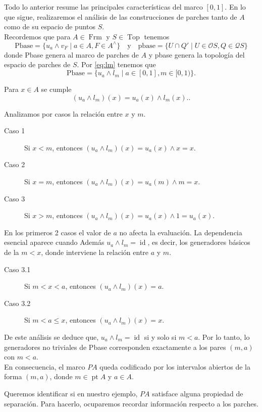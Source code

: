 \documentclass[12pt]{article}
\DeclareMathOperator{\Frm}{Frm}
\DeclareMathOperator{\Top}{Top}
\DeclareMathOperator{\pt}{pt}
\DeclareMathOperator{\id}{id}
\begin{document}
Todo lo anterior resume las principales características del marco $[0,1]$. En lo que sigue, realizaremos el análisis de las construcciones de parches tanto de 
$A$ como de su espacio de puntos $S$.\\

Recordemos que para $A\in \Frm$ y $S\in \Top$ tenemos 
\[
\text{Pbase}=\{u_a\wedge v_F\mid a\in A, F\in A^\wedge\}\quad \text{y}\quad \text{pbase}=\{U\cap Q'\mid U\in \mathcal{O}S, Q\in \mathcal{Q}S\}
\]
donde Pbase genera al marco de parches de $A$ y pbase genera la topología del espacio de parches de $S$. Por \eqref{eq:lm} tenemos que 
\[
\text{Pbase}=\{u_a\wedge l_m\mid a\in [0,1], m\in [0,1)\}.
\]

Para $x\in A$  se cumple
\[
(u_a\wedge l_m)(x)=u_a(x)\wedge l_m(x)..
\]

Analizamos por casos la relación entre $x$ y $m$.
\begin{description}
\item[Caso 1] Si $x<m$, entonces $(u_a\wedge l_m)(x)=u_a(x)\wedge x=x$.
\item[Caso 2] Si $x=m$, entonces $(u_a\wedge l_m)(x)=u_a(m)\wedge m=x$.
\item[Caso 3] Si $x>m$, entonces $(u_a\wedge l_m)(x)=u_a(x)\wedge 1=u_a(x)$.
\end{description}

En los primeros 2 casos el valor de $a$ no afecta la evaluación. La dependencia esencial aparece cuando Además $u_a\wedge l_m=\id$, es decir, los generadores básicos de la 
$m<x$, donde interviene la relación entre $a$ y $m$.
\begin{description}
\item[Caso 3.1] Si $m<x<a$, entonces $(u_a\wedge l_m)(x)=a$.
\item[Caso 3.2] Si $m<a\leq x$, entonces $(u_a\wedge l_m)(x)=x$.
\end{description}

De este análisis se deduce que, $u_a\wedge l_m=\id$ si y solo si $m<a$. Por lo tanto, lo generadores no triviales de Pbase corresponden exactamente a los pares
$(m, a)$ con $m<a$.\\

En consecuencia, el marco $PA$ queda codificado por los intervalos abiertos de la forma $(m,a)$, donde $m\in \pt A$ y $a\in A$.

Queremos identificar si en nuestro ejemplo, $PA$ satisface alguna propiedad de separación. Para hacerlo, ocuparemos recordar información respecto a los parches.\\
\end{document}
